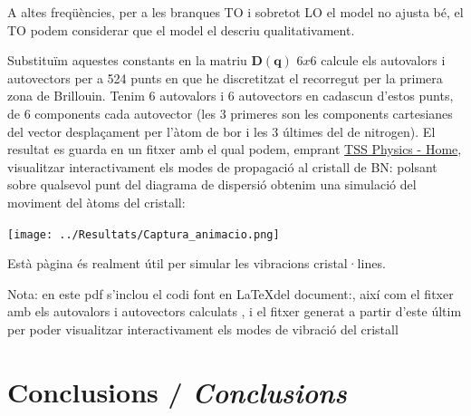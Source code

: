 \documentclass[12pt]{article} %
\let\vec\mathbf %
\begin{document}
A altes freqüències, per a les branques TO i sobretot LO el model no ajusta bé, el TO podem considerar que el model el descriu qualitativament.


Substituïm aquestes constants en la matriu $\vec D(\vec q)$ $6x6$ calcule els autovalors i autovectors per a 524 punts en que he discretitzat el recorregut per la primera zona de Brillouin. Tenim 6 autovalors i 6 autovectors en cadascun d'estos punts, de 6 components cada autovector (les 3 primeres son les components cartesianes del vector desplaçament per l'àtom de bor i les 3 últimes del de nitrogen). El resultat es guarda en un fitxer  amb el qual podem, emprant \href{https://henriquemiranda.github.io/phononwebsite/index.html}{TSS Physics - Home}, visualitzar interactivament els modes de propagació al cristall de BN: polsant sobre qualsevol punt del diagrama de dispersió obtenim una simulació del moviment del àtoms del cristall:

\begin{center}
 \texttt{[image: ../Resultats/Captura\_animacio.png]}
\end{center}

Està pàgina és realment útil per simular les vibracions cristal·lines.

\vspace{2cm}

Nota: en este pdf s'inclou el codi font en \LaTeX  del document:, així com el fitxer amb els autovalors i autovectors calculats , i el fitxer generat a partir d'este últim per poder visualitzar  interactivament els modes de vibració del cristall 

\section{Conclusions / \emph{Conclusions}}
\end{document}

